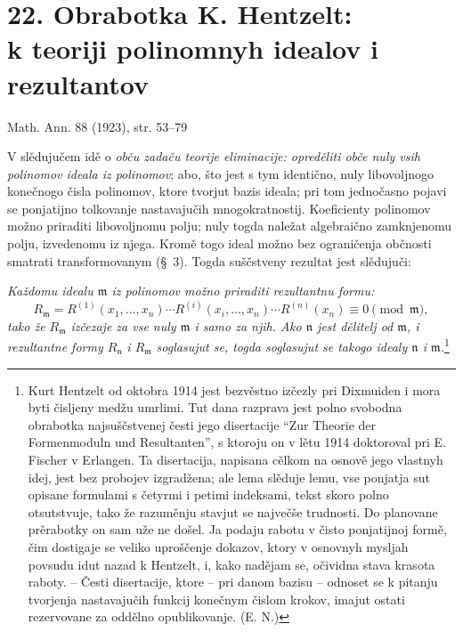 \documentclass[11pt]{article}
\providecommand{\mideal}{\mathfrak m}
\providecommand{\nideal}{\mathfrak n}
\providecommand{\zero}[1]{\equiv 0\pmod{#1}}
\begin{document}
\setcounter{footnote}{0}
\section*{22. Obrabotka K. Hentzelt:\\ k teoriji polinomnyh idealov i rezultantov}
\begin{center}
Math. Ann. 88 (1923), str. 53--79
\end{center}

V slědujučem idě o \emph{obču zadaču teorije eliminacije: opreděliti obče nuly vsih polinomov ideala iz polinomov}; abo, što jest s tym identično, nuly libovoljnogo konečnogo čisla polinomov, ktore tvorjut bazis ideala; pri tom jednočasno pojavi se ponjatijno tolkovanje nastavajučih mnogokratnostij. Koeficienty polinomov možno priraditi libovoljnomu polju; nuly togda naležat algebraično zamknjenomu polju, izvedenomu iz njega. Kromě togo ideal možno bez ograničenja občnosti smatrati transformovanym (§~3). Togda suščstveny rezultat jest slědujuči:

\emph{Každomu idealu $\mideal$ iz polinomov možno priraditi rezultantnu formu:}
\[
 R_{\mideal}=R^{(1)}(x_1,\ldots,x_n)\cdots
 R^{(i)}(x_i,\ldots,x_n)\cdots R^{(n)}(x_n)\zero{\mideal},
\]
\emph{tako že $R_{\mideal}$ izčezaje za vse nuly $\mideal$ i samo za njih. Ako $\nideal$ jest dělitelj od $\mideal$, i rezultantne formy $R_{\nideal}$ i $R_{\mideal}$ soglasujut se, togda soglasujut se takogo idealy $\nideal$ i $\mideal$.}\footnote{Kurt Hentzelt od oktobra 1914 jest bezvěstno izčezly pri Dixmuiden i mora byti čisljeny medžu umrlimi. Tut dana razprava jest polno svobodna obrabotka najsuščstvenej česti jego disertacije ``Zur Theorie der Formenmoduln und Resultanten'', s ktoroju on v lětu 1914 doktoroval pri E. Fischer v Erlangen. Ta disertacija, napisana cělkom na osnově jego vlastnyh idej, jest bez probojev izgradžena; ale lema slěduje lemu, vse ponjatja sut opisane formulami s četyrmi i petimi indeksami, tekst skoro polno otsutstvuje, tako že razuměnju stavjut se največše trudnosti. Do planovane prěrabotky on sam uže ne došel. Ja podaju rabotu v čisto ponjatijnoj formě, čim dostigaje se veliko uproščenje dokazov, ktory v osnovnyh mysljah povsudu idut nazad k Hentzelt, i, kako nadějam se, očividna stava krasota raboty. -- Česti disertacije, ktore -- pri danom bazisu -- odnoset se k pitanju tvorjenja nastavajučih funkcij konečnym čislom krokov, imajut ostati rezervovane za oddělno opublikovanje. (E. N.)}
\end{document}
